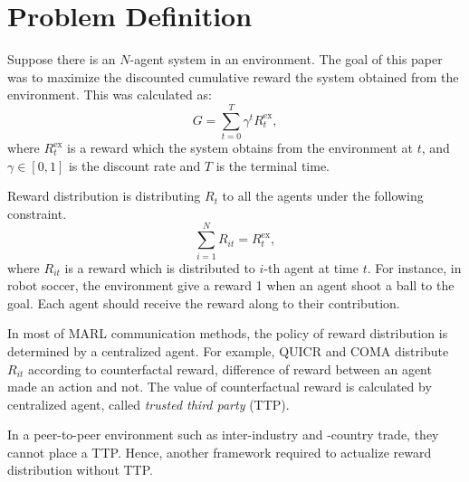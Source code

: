 \section{Problem Definition}
Suppose there is an $N$-agent system in an environment. 
The goal of this paper was to maximize the discounted cumulative reward the system obtained from the environment.
This was calculated as:
\begin{equation}
	G = \sum_{t=0}^T \gamma^t R_t^\mathrm{ex},
\end{equation}
where $R_{t}^\mathrm{ex}$ is a reward which the system obtains from the environment at $t$, 
and $\gamma \in [0, 1]$ is the discount rate and $T$ is the terminal time.

Reward distribution is distributing $R_t$ to all the agents under the following constraint.
\begin{equation}
	\sum_{i=1}^N R_{it} = R_t^\mathrm{ex},
	\label{eq:reward_const}
\end{equation}
where $R_{it}$ is a reward which is distributed to $i$-th agent at time $t$.
For instance, in robot soccer, the environment give a reward 1 when an agent shoot a ball to the goal.
Each agent should receive the reward along to their contribution.

In most of MARL communication methods, the policy of reward distribution is determined by a centralized agent.
For example, QUICR \citep{agogino2006quicr} and COMA \citep{foerster2017counterfactual} distribute $R_{it}$ according to counterfactal reward, difference of reward between an agent made an action and not.
The value of counterfactual reward is calculated by centralized agent, called {\em trusted third party} (TTP).

In a peer-to-peer environment such as inter-industry and -country trade, they cannot place a TTP. 
Hence, another framework required to actualize reward distribution without TTP.
